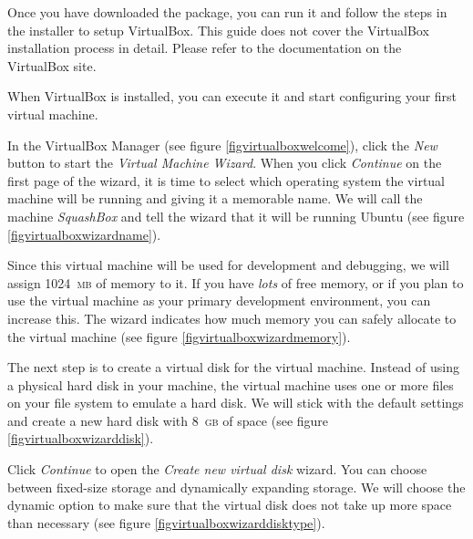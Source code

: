 \documentclass[draft,ebook,10pt,twoside,openright]{memoir}
\begin{document}

Once you have downloaded the package, you can run it and follow the steps in the installer to setup VirtualBox. This guide does not cover the VirtualBox installation process in detail. Please refer to the documentation on the VirtualBox site.

When VirtualBox is installed, you can execute it and start configuring your first virtual machine.


In the VirtualBox Manager (see figure \ref{figvirtualboxwelcome}), click the \emph{New} button to start the \emph{Virtual Machine Wizard}. When you click \emph{Continue} on the first page of the wizard, it is time to select which operating system the virtual machine will be running and giving it a memorable name. We will call the machine \emph{SquashBox} and tell the wizard that it will be running Ubuntu (see figure \ref{figvirtualboxwizardname}).


Since this virtual machine will be used for development and debugging, we will assign 1024~\textsc{mb} of memory to it. If you have \emph{lots} of free memory, or if you plan to use the virtual machine as your primary development environment, you can increase this. The wizard indicates how much memory you can safely allocate to the virtual machine (see figure \ref{figvirtualboxwizardmemory}).


The next step is to create a virtual disk for the virtual machine. Instead of using a physical hard disk in your machine, the virtual machine uses one or more files on your file system to emulate a hard disk. We will stick with the default settings and create a new hard disk with 8~\textsc{gb} of space (see figure \ref{figvirtualboxwizarddisk}).


Click \emph{Continue} to open the \emph{Create new virtual disk} wizard. You can choose between fixed-size storage and dynamically expanding storage. We will choose the dynamic option to make sure that the virtual disk does not take up more space than necessary (see figure \ref{figvirtualboxwizarddisktype}).
\end{document}
